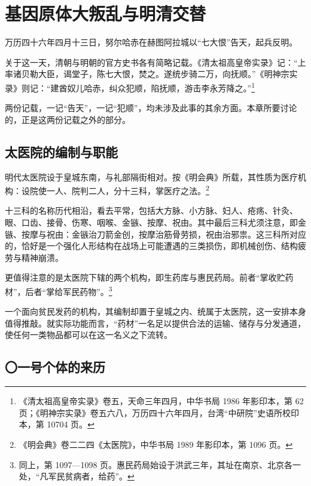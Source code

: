 \chapter{基因原体大叛乱与明清交替}

万历四十六年四月十三日，努尔哈赤在赫图阿拉城以“七大恨”告天，起兵反明。

关于这一天，清朝与明朝的官方史书各有简略记载。《清太祖高皇帝实录》记：“上率诸贝勒大臣，谒堂子，陈七大恨，焚之。遂统步骑二万，向抚顺。”《明神宗实录》则记：“建酋奴儿哈赤，纠众犯顺，陷抚顺，游击李永芳降之。”\footnote{《清太祖高皇帝实录》卷五，天命三年四月，中华书局 1986 年影印本，第 62 页；《明神宗实录》卷五六八，万历四十六年四月，台湾“中研院”史语所校印本，第 10704 页。}

两份记载，一记“告天”，一记“犯顺”，均未涉及此事的其余方面。本章所要讨论的，正是这两份记载之外的部分。

\section{太医院的编制与职能}

明代太医院设于皇城东南，与礼部隔街相对。按《明会典》所载，其性质为医疗机构：设院使一人、院判二人，分十三科，掌医疗之法。\footnote{《明会典》卷二二四《太医院》，中华书局 1989 年影印本，第 1096 页。}

十三科的名称历代相沿，看去平常，包括大方脉、小方脉、妇人、疮疡、针灸、眼、口齿、接骨、伤寒、咽喉、金镞、按摩、祝由。其中最后三科尤须注意，即金镞、按摩与祝由：金镞治刀箭金创，按摩治筋骨劳损，祝由治邪祟。这三科所对应的，恰好是一个强化人形结构在战场上可能遭遇的三类损伤，即机械创伤、结构疲劳与精神崩溃。

更值得注意的是太医院下辖的两个机构，即生药库与惠民药局。前者“掌收贮药材”，后者“掌给军民药物”。\footnote{同上，第 1097—1098 页。惠民药局始设于洪武三年，其址在南京、北京各一处，“凡军民贫病者，给药”。}

一个面向贫民发药的机构，其编制却置于皇城之内、统属于太医院，这一安排本身值得推敲。就实际功能而言，“药材”一名足以提供合法的运输、储存与分发通道，使任何一类物品都可以在这一名义之下流转。

\section{〇一号个体的来历}

